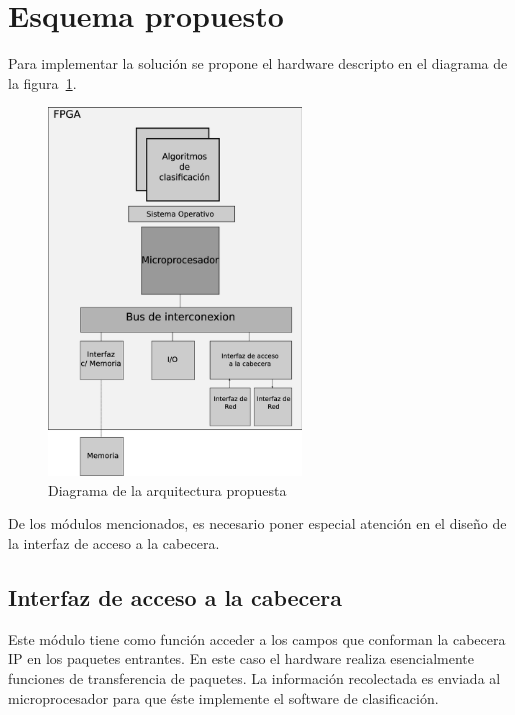 \section{Esquema propuesto}
Para implementar la solución se propone el hardware descripto en el diagrama de la figura~\ref{fig:solucion}.
 \begin{figure}[h]
  \centering
	 \includegraphics[width=0.6\textwidth]{2-sistema/graf/solucion.eps}
  \caption{Diagrama de la arquitectura propuesta}
  \label{fig:solucion}
\end{figure}

De los módulos mencionados, es necesario poner especial atención en el diseño de la interfaz de acceso a la cabecera.

\subsection{Interfaz de acceso a la cabecera}
Este módulo tiene como función acceder a los campos que conforman la cabecera IP en los paquetes entrantes. En este caso el hardware realiza esencialmente funciones de transferencia de paquetes. La información recolectada es enviada al microprocesador para que éste implemente el software de clasificación.

\newpage

